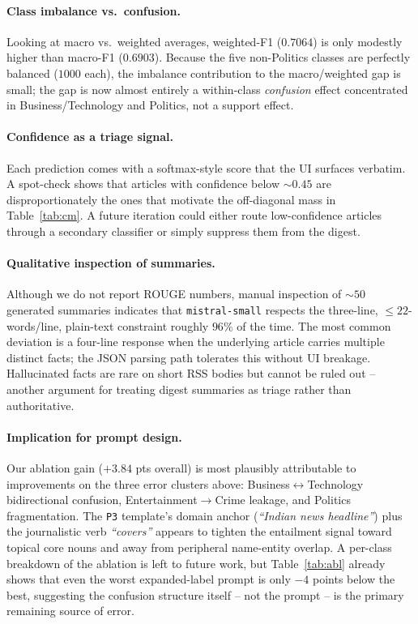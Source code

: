 \documentclass[10pt,twocolumn,letterpaper]{article}
\begin{document}
\paragraph{Class imbalance vs.\ confusion.} Looking at macro vs.\ weighted averages, weighted-F1 ($0.7064$) is only modestly higher than macro-F1 ($0.6903$). Because the five non-Politics classes are perfectly balanced ($1000$ each), the imbalance contribution to the macro/weighted gap is small; the gap is now almost entirely a within-class \emph{confusion} effect concentrated in Business/Technology and Politics, not a support effect.

\paragraph{Confidence as a triage signal.} Each prediction comes with a softmax-style score that the UI surfaces verbatim. A spot-check shows that articles with confidence below $\sim 0.45$ are disproportionately the ones that motivate the off-diagonal mass in Table~\ref{tab:cm}. A future iteration could either route low-confidence articles through a secondary classifier or simply suppress them from the digest.

\paragraph{Qualitative inspection of summaries.} Although we do not report ROUGE numbers, manual inspection of $\sim 50$ generated summaries indicates that \texttt{mistral-small} respects the three-line, $\leq 22$-words/line, plain-text constraint roughly $96\%$ of the time. The most common deviation is a four-line response when the underlying article carries multiple distinct facts; the JSON parsing path tolerates this without UI breakage. Hallucinated facts are rare on short RSS bodies but cannot be ruled out -- another argument for treating digest summaries as triage rather than authoritative.

\paragraph{Implication for prompt design.} Our ablation gain ($+3.84$ pts overall) is most plausibly attributable to improvements on the three error clusters above: Business$\leftrightarrow$Technology bidirectional confusion, Entertainment$\rightarrow$Crime leakage, and Politics fragmentation. The \texttt{P3} template's domain anchor (\textit{``Indian news headline''}) plus the journalistic verb \textit{``covers''} appears to tighten the entailment signal toward topical core nouns and away from peripheral name-entity overlap. A per-class breakdown of the ablation is left to future work, but Table~\ref{tab:abl} already shows that even the worst expanded-label prompt is only $-4$ points below the best, suggesting the confusion structure itself -- not the prompt -- is the primary remaining source of error.
\end{document}
